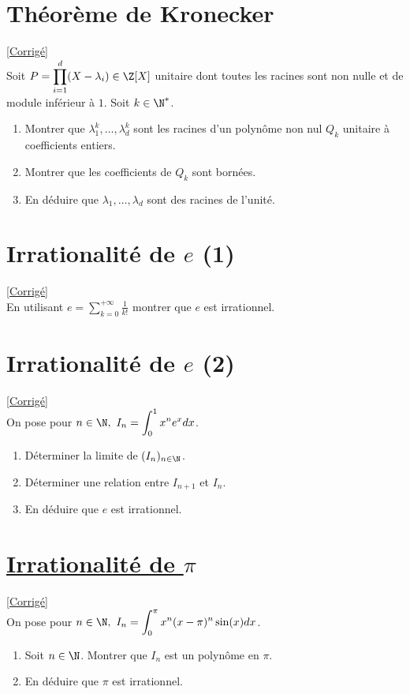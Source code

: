 \documentclass[8pt]{book}
\begin{document}
	\section{Théorème de Kronecker }
	\label{Théorème de Kronecker}
	\textcolor{blue}{\hyperref[Théorème de Kronecker corrigé]{[Corrigé]}}\\
	Soit $P=\displaystyle\prod_{i=1}^d(X-\lambda_i)\in \Z[X]$ unitaire dont toutes les racines sont non nulle et de module inférieur à $1$. Soit $k\in \N^*$.
	\begin{enumerate}
		\item Montrer que $\lambda_1^k,\dots,\lambda_d^k$ sont les racines d'un polynôme non nul $Q_k$ unitaire à coefficients entiers.
		\item Montrer que les coefficients de $Q_k$ sont bornées.
		\item En déduire que $\lambda_1,\dots,\lambda_d$ sont des racines de l'unité.
	\end{enumerate}
	
	\section{Irrationalité de $e$ (1) }
	\label{Irrationalité de e (1)}
	\textcolor{blue}{\hyperref[Irrationalité de e (1) corrigé]{[Corrigé]}}\\
	En utilisant $e=\displaystyle\sum_{k=0}^{+\infty}\frac{1}{k!}$ montrer que $e$ est irrationnel.
	
	\section{Irrationalité de $e$ (2) }
	\label{Irrationalité de e (2)}
	\textcolor{blue}{\hyperref[Irrationalité de e (2) corrigé]{[Corrigé]}}\\
	On pose pour $n\in \N,\ I_n=\displaystyle\int_0^1x^ne^xdx$.\\
	\begin{enumerate}
		\item Déterminer la limite de $(I_n)_{n\in \N}$.
		\item Déterminer une relation entre $I_{n+1}$ et $I_n$.
		\item En déduire que $e$ est irrationnel.
	\end{enumerate}
	
	\section{\underline{Irrationalité de $\pi$} }
	\label{Irrationalité de pi}
	\textcolor{blue}{\hyperref[Irrationalité de pi corrigé]{[Corrigé]}}\\
	On pose pour $n\in \N,\ I_n=\displaystyle\int_0^\pi x^n(x-\pi)^n\sin (x)dx$.
	\begin{enumerate}
		\item Soit $n\in \N$. Montrer que $I_n$ est un polynôme en $\pi$.
		\item En déduire que $\pi$ est irrationnel.
	\end{enumerate}
	
\end{document}

